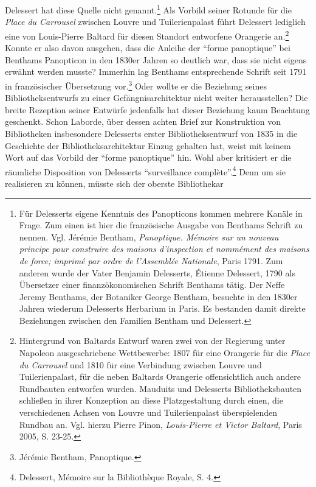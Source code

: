 Delessert hat diese Quelle nicht genannt.\footnote{Für Delesserts eigene
  Kenntnis des Panopticons kommen mehrere Kanäle in Frage. Zum einen ist
  hier die französische Ausgabe von Benthams Schrift zu nennen. Vgl.
  Jérémie Bentham, \emph{Panoptique. Mémoire sur un nouveau principe
  pour construire des maisons d'inspection et nommément des maisons de
  force; imprimé par ordre de l'Assemblée Nationale}, Paris 1791. Zum
  anderen wurde der Vater Benjamin Delesserts, Étienne Delessert, 1790
  als Übersetzer einer finanzökonomischen Schrift Benthams tätig. Der
  Neffe Jeremy Benthams, der Botaniker George Bentham, besuchte in den
  1830er Jahren wiederum Delesserts Herbarium in Paris. Es bestanden
  damit direkte Beziehungen zwischen den Familien Bentham und Delessert.}
Als Vorbild seiner Rotunde für die \emph{Place du Carrousel} zwischen
Louvre und Tuilerienpalast führt Delessert lediglich eine von
Louis-Pierre Baltard für diesen Standort entworfene Orangerie
an.\footnote{Hintergrund von Baltards Entwurf waren zwei von der
  Regierung unter Napoleon ausgeschriebene Wettbewerbe: 1807 für eine
  Orangerie für die \emph{Place du Carrousel} und 1810 für eine
  Verbindung zwischen Louvre und Tuilerienpalast, für die neben Baltards
  Orangerie offensichtlich auch andere Rundbauten entworfen wurden.
  Mauduits und Delesserts Bibliotheksbauten schließen in ihrer
  Konzeption an diese Platzgestaltung durch einen, die verschiedenen
  Achsen von Louvre und Tuilerienpalast überspielenden Rundbau an. Vgl.
  hierzu Pierre Pinon, \emph{Louis-Pierre et Victor Baltard}, Paris
  2005, S. 23-25.} Konnte er also davon ausgehen, dass die Anleihe der
\enquote{forme panoptique} bei Benthams Panopticon in den 1830er Jahren
so deutlich war, dass sie nicht eigens erwähnt werden musste? Immerhin
lag Benthams entsprechende Schrift seit 1791 in französischer
Übersetzung vor.\footnote{Jérémie Bentham, Panoptique.} Oder wollte er
die Beziehung seines Bibliotheksentwurfs zu einer Gefängnisarchitektur
nicht weiter herausstellen? Die breite Rezeption seiner Entwürfe
jedenfalls hat dieser Beziehung kaum Beachtung geschenkt. Schon Laborde,
über dessen achten Brief zur Konstruktion von Bibliotheken insbesondere
Delesserts erster Bibliotheksentwurf von 1835 in die Geschichte der
Bibliotheksarchitektur Einzug gehalten hat, weist mit keinem Wort auf
das Vorbild der \enquote{forme panoptique} hin. Wohl aber kritisiert er
die räumliche Disposition von Delesserts \enquote{surveillance
complète}.\footnote{Delessert, Mémoire sur la Bibliothèque Royale, S. 4.}
Denn um sie realisieren zu können, müsste sich der oberste Bibliothekar
